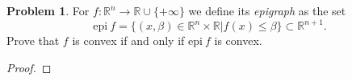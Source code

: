 \documentclass[12pt]{article}
\theoremstyle{definition}
\newtheorem{problem}{Problem}
\begin{document}
\begin{problem}
  For $f: \mathbb{R}^n \to \mathbb{R} \cup \{+\infty\}$ we define its \textit{epigraph}
  as the set
  \[
   \text{epi}\ f = \{(x, \beta) \in \mathbb{R}^n \times \mathbb{R} | f(x) \leq \beta \} \subset \mathbb{R}^{n+1}.
  \]
  Prove that $f$ is convex if and only if $\text{epi}\ f$ is convex.
\end{problem}

\begin{proof}
\end{proof}
\end{document}

